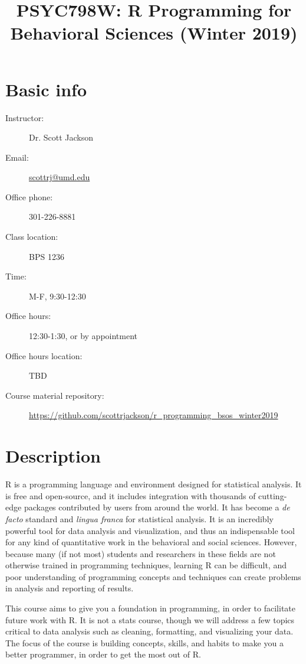 \documentclass{tufte-handout}
\date{}
\title{PSYC798W: R Programming for Behavioral Sciences (Winter 2019)}
\begin{document}
\maketitle
\section*{Basic info}
\label{sec:org3c04f5f}
\begin{description}
\item[{Instructor:}] Dr. Scott Jackson
\item[{Email:}] \href{mailto:scottrj@umd.edu}{scottrj@umd.edu}
\item[{Office phone:}] 301-226-8881
\item[{Class location:}] BPS 1236
\item[{Time:}] M-F, 9:30-12:30
\item[{Office hours:}] 12:30-1:30, or by appointment
\item[{Office hours location:}] TBD
\item[{Course material repository:}] \url{https://github.com/scottrjackson/r\_programming\_bsos\_winter2019}
\end{description}

\section*{Description}
\label{sec:orgaadade7}
R  is a programming language and environment designed for statistical analysis. It is free and open-source, and it includes integration with thousands of cutting-edge packages contributed by users from around the world. It has become a \emph{de facto} standard and \emph{lingua franca} for statistical analysis.  It is an incredibly powerful tool for data analysis and visualization, and thus an indispensable tool for any kind of quantitative work in the behavioral and social sciences. However, because many (if not most) students and researchers in these fields are not otherwise trained in programming techniques, learning R can be difficult, and poor understanding of programming concepts and techniques can create problems in analysis and reporting of results. 

This course aims to give you a foundation in programming, in order to facilitate future work with R.  It is not a stats course, though we will address a few topics critical to data analysis such as cleaning, formatting, and visualizing your data.  The focus of the course is building concepts, skills, and habits to make you a better programmer, in order to get the most out of R.
\end{document}
